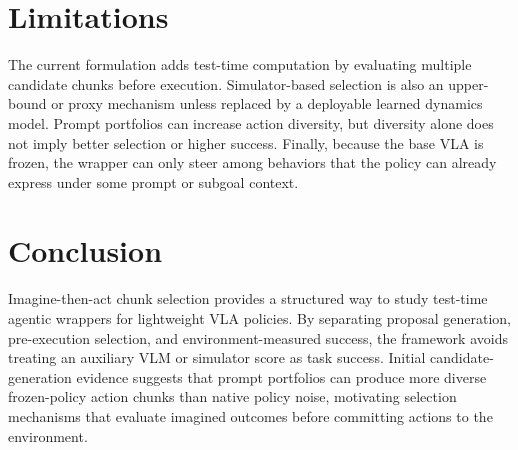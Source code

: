 \documentclass[conference]{IEEEtran}
\begin{document}
\section{Limitations}

The current formulation adds test-time computation by evaluating multiple
candidate chunks before execution. Simulator-based selection is also an
upper-bound or proxy mechanism unless replaced by a deployable learned dynamics
model. Prompt portfolios can increase action diversity, but diversity alone
does not imply better selection or higher success. Finally, because the base
VLA is frozen, the wrapper can only steer among behaviors that the policy can
already express under some prompt or subgoal context.

\section{Conclusion}

Imagine-then-act chunk selection provides a structured way to study test-time
agentic wrappers for lightweight VLA policies. By separating proposal
generation, pre-execution selection, and environment-measured success, the
framework avoids treating an auxiliary VLM or simulator score as task success.
Initial candidate-generation evidence suggests that prompt portfolios can
produce more diverse frozen-policy action chunks than native policy noise,
motivating selection mechanisms that evaluate imagined outcomes before
committing actions to the environment.



\end{document}
